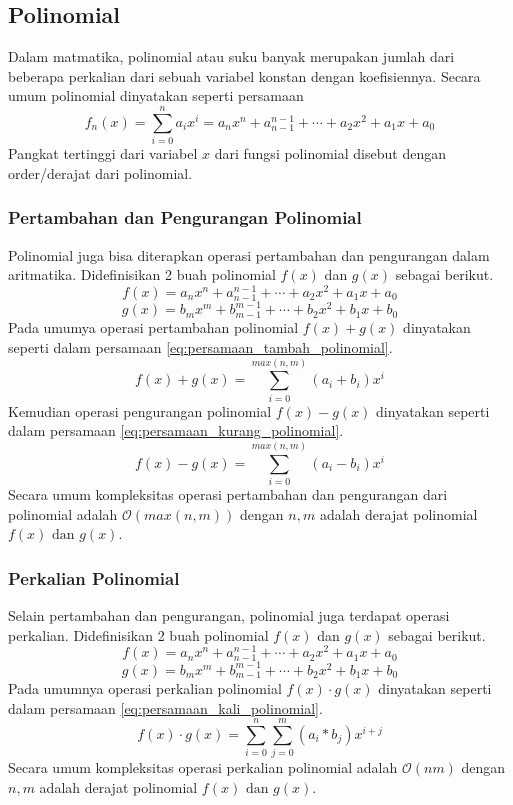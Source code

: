 \subsection{ Polinomial}
Dalam matmatika, polinomial atau suku banyak merupakan jumlah dari beberapa perkalian dari sebuah variabel konstan dengan koefisiennya\cite{}. Secara umum polinomial dinyatakan seperti persamaan \label{eq:persamaan_umum_polinomial}
\begin{equation}
	f_n(x) = \sum_{i=0}^{n} a_i x^i = a_n x^n + a_{n-1}^{n-1} + \cdots + a_2x^2 + a_1x + a_0
	\label{eq:persamaan_umum_polinomial}
\end{equation}
Pangkat tertinggi dari variabel $ x $ dari fungsi polinomial disebut dengan order/derajat dari polinomial.

\subsubsection{ Pertambahan dan Pengurangan Polinomial}
Polinomial juga bisa diterapkan operasi pertambahan dan pengurangan dalam aritmatika. 
Didefinisikan 2 buah polinomial $f(x)$ dan $g(x)$ sebagai berikut.
$$ f(x) = a_n x^n + a_{n-1}^{n-1} + \cdots + a_2x^2 + a_1x + a_0 $$
$$ g(x) = b_m x^m + b_{m-1}^{m-1} + \cdots + b_2x^2 + b_1x + b_0 $$
Pada umumya operasi pertambahan polinomial $ f(x) + g(x) $ dinyatakan seperti dalam persamaan \eqref{eq:persamaan_tambah_polinomial}.
\begin{equation}
	f(x) + g(x) = \sum_{i=0}^{max(n,m)} (a_i + b_i) x^i
	\label{eq:persamaan_tambah_polinomial} 
\end{equation}
Kemudian operasi pengurangan polinomial $ f(x) - g(x) $ dinyatakan seperti dalam persamaan \eqref{eq:persamaan_kurang_polinomial}.
\begin{equation}
	f(x) - g(x) = \sum_{i=0}^{max(n,m)} (a_i - b_i) x^i
	\label{eq:persamaan_kurang_polinomial} 
\end{equation}
Secara umum kompleksitas operasi pertambahan dan pengurangan dari polinomial adalah $ \mathcal{O}{(max(n,m))} $ dengan $ n , m $ adalah derajat polinomial $ f(x) \text{ dan } g(x) $.

\subsubsection{ Perkalian Polinomial}
Selain pertambahan dan pengurangan, polinomial juga terdapat operasi perkalian.
Didefinisikan 2 buah polinomial $f(x)$ dan $g(x)$ sebagai berikut.
$$ f(x) = a_n x^n + a_{n-1}^{n-1} + \cdots + a_2x^2 + a_1x + a_0 $$
$$ g(x) = b_m x^m + b_{m-1}^{m-1} + \cdots + b_2x^2 + b_1x + b_0 $$
Pada umumnya operasi perkalian polinomial $ f(x) \cdot g(x) $ dinyatakan seperti dalam persamaan \eqref{eq:persamaan_kali_polinomial}.
\begin{equation}
	f(x) \cdot g(x) = \sum_{i=0}^{n} \sum_{j=0}^{m} (a_i * b_j) x^{i+j}
	\label{eq:persamaan_kali_polinomial}
\end{equation}
Secara umum kompleksitas operasi perkalian polinomial adalah $ \mathcal{O}{(nm)} $ dengan $ n , m $ adalah derajat polinomial $ f(x) \text{ dan } g(x) $.

